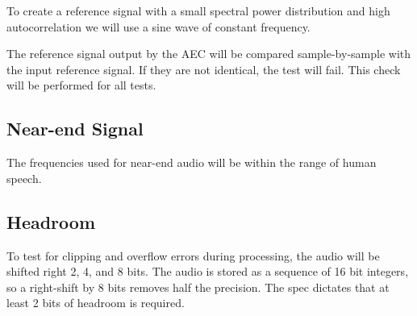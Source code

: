 \documentclass[a4paper,10pt]{article}
\begin{document}
To create a reference signal with a small spectral power distribution and high
autocorrelation we will use a sine wave of constant frequency.

The reference signal output by the AEC will be compared sample-by-sample with
the input reference signal. If they are not identical, the test will fail. This
check will be performed for all tests.

\subsection{Near-end Signal}

The frequencies used for near-end audio will be within the range of human
speech.

\subsection{Headroom}

To test for clipping and overflow errors during processing, the audio will be
shifted right 2, 4, and 8 bits. The audio is stored as a sequence of 16 bit
integers, so a right-shift by 8 bits removes half the precision. The spec
dictates that at least 2 bits of headroom is required.
\end{document}
